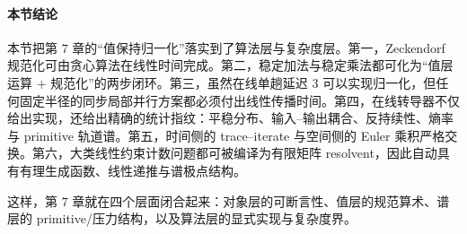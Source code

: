 \paragraph{本节结论}
本节把第 \(7\) 章的“值保持归一化”落实到了算法层与复杂度层。第一，Zeckendorf 规范化可由贪心算法在线性时间完成。第二，稳定加法与稳定乘法都可化为“值层运算 + 规范化”的两步闭环。第三，虽然在线单趟延迟 \(3\) 可以实现归一化，但任何固定半径的同步局部并行方案都必须付出线性传播时间。第四，在线转导器不仅给出实现，还给出精确的统计指纹：平稳分布、输入--输出耦合、反持续性、熵率与 primitive 轨道谱。第五，时间侧的 trace--iterate 与空间侧的 Euler 乘积严格交换。第六，大类线性约束计数问题都可被编译为有限矩阵 resolvent，因此自动具有有理生成函数、线性递推与谱极点结构。

这样，第 \(7\) 章就在四个层面闭合起来：对象层的可断言性、值层的规范算术、谱层的 primitive/压力结构，以及算法层的显式实现与复杂度界。
